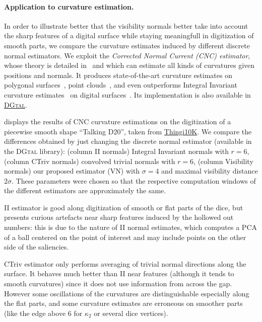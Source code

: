 \documentclass[runningheads]{llncs}
\begin{document}
    \paragraph{Application to curvature estimation.}
    In order to illustrate better that the visibility normals better
    take into account the sharp features of a digital surface while
    staying meaningfull in digitization of smooth parts, we compare
    the curvature estimates induced by different discrete normal
    estimators. We exploit the \emph{Corrected Normal Current (CNC)
        estimator}, whose theory is detailed in~\cite{lachaud:2022-dcg}
    and which can estimate all kinds of curvatures given positions and
    normals. It produces state-of-the-art curvature estimates on
    polygonal surfaces~\cite{lachaud:2020-cgf}, point clouds~\cite{lachaud:2023-cgf}, and even outperforms Integral Invariant
    curvature estimates~\cite{coeurjolly:2014-cviu} on digital
    surfaces~\cite{lachaud:2022-dcg}. Its implementation is also
    available in    \href{https://dgtal-team.github.io/doc-nightly/moduleCurvatureMeasures.html}{\textsc{DGtal}}.

     displays the results of CNC curvature
    estimations on the digitization of a piecewise smooth shape
    ``Talking D20'', taken from
    \href{https://ten-thousand-models.appspot.com/detail.html?file_id=1533028}{Thingi10K}.
    We compare the differences obtained by just changing the discrete
    normal estimator (available in the \textsc{DGtal} library):
    (column II normals) Integral Invariant normals with $r=6$, (column
    CTriv normals) convolved trivial normals with $r=6$, (column
    Visibility normals) our proposed estimator (VN) with $\sigma=4$ and
    maximal visibility distance $2\sigma$. These parameters were
    chosen so that the respective computation windows of the different
    estimators are approximately the same.

    II estimator is good along digitization of smooth or flat parts of
    the dice, but presents curious artefacts near sharp features
    induced by the hollowed out numbers: this is due to the nature of
    II normal estimates, which computes a PCA of a ball centered on
    the point of interest and may include points on the other side of
    the saliencies.

    CTriv estimator only performs averaging of trivial normal
    directions along the surface. It behaves much better than II near
    features (although it tends to smooth curvatures) since it does
    not use information from across the gap. However some oscillations
    of the curvatures are distinguishable especially along the flat
    parts, and some curvature estimates are erroneous on smoother
    parts (like the edge above 6 for $\kappa_2$ or several dice
    vertices).
\end{document}
